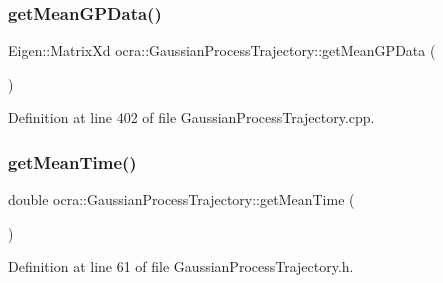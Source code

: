\hypertarget{classocra_1_1GaussianProcessTrajectory_a3fcbdcde2ce99b1bbf1835b2d90e7627}{}\label{classocra_1_1GaussianProcessTrajectory_a3fcbdcde2ce99b1bbf1835b2d90e7627} 
\subsubsection{\texorpdfstring{get\+Mean\+G\+P\+Data()}{getMeanGPData()}}
{\footnotesize\ttfamily Eigen\+::\+Matrix\+Xd ocra\+::\+Gaussian\+Process\+Trajectory\+::get\+Mean\+G\+P\+Data (\begin{DoxyParamCaption}{ }\end{DoxyParamCaption})}



Definition at line 402 of file Gaussian\+Process\+Trajectory.\+cpp.

\hypertarget{classocra_1_1GaussianProcessTrajectory_af8cc8748b3d59d41a9af05549cb02228}{}\label{classocra_1_1GaussianProcessTrajectory_af8cc8748b3d59d41a9af05549cb02228} 
\subsubsection{\texorpdfstring{get\+Mean\+Time()}{getMeanTime()}}
{\footnotesize\ttfamily double ocra\+::\+Gaussian\+Process\+Trajectory\+::get\+Mean\+Time (\begin{DoxyParamCaption}{ }\end{DoxyParamCaption})\hspace{0.3cm}{\ttfamily [inline]}}



Definition at line 61 of file Gaussian\+Process\+Trajectory.\+h.

\hypertarget{classocra_1_1GaussianProcessTrajectory_ae48f9f25299cf749a973e4b4341ec909}{}\label{classocra_1_1GaussianProcessTrajectory_ae48f9f25299cf749a973e4b4341ec909} 

